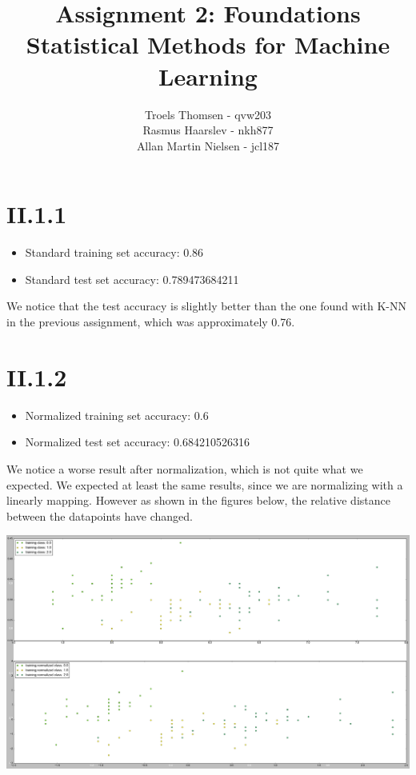 \documentclass[12pt, a4paper]{article}
\title{Assignment 2: Foundations\\Statistical Methods for Machine Learning}
\author{Troels Thomsen - qvw203\\Rasmus Haarslev - nkh877\\Allan Martin Nielsen - jcl187}
\begin{document}
\pagestyle{empty}
\maketitle
{}
\newpage

\tableofcontents
\newpage

\pagestyle{fancy}

\section{II.1.1}
\begin{itemize}
	\item Standard training set accuracy: 0.86
	\item Standard test set accuracy: 0.789473684211
\end{itemize}

We notice that the test accuracy is slightly better than the one found with K-NN in the previous assignment, which was approximately 0.76.

\section{II.1.2}
\begin{itemize}
	\item Normalized training set accuracy: 0.6
	\item Normalized test set accuracy: 0.684210526316
\end{itemize}

We notice a worse result after normalization, which is not quite what we expected. We expected at least the same results, since we are normalizing with a linearly mapping.
However as shown in the figures below, the relative distance between the datapoints have changed.

\includegraphics[scale=0.25]{lda_normalization.png}
\end{document}
